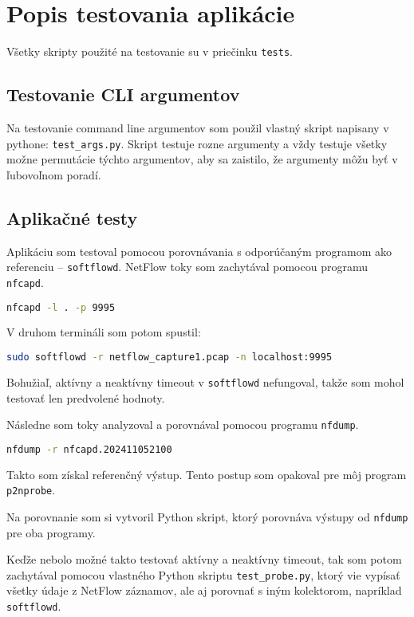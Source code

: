 \documentclass[a4paper, 12pt]{article}
\begin{document}
\newpage
\section{Popis testovania aplikácie}

Všetky skripty použité na testovanie su v priečinku \texttt{tests}.

\subsection{Testovanie CLI argumentov}
Na testovanie command line argumentov som použil vlastný skript napisany v pythone: \texttt{test\_args.py}.
Skript testuje rozne argumenty a vždy testuje všetky možne permutácie týchto argumentov, aby sa zaistilo, že argumenty môžu byť v ľubovoľnom poradí.

\subsection{Aplikačné testy}
Aplikáciu som testoval pomocou porovnávania s odporúčaným programom ako referenciu -- \texttt{softflowd}\cite{softflowd}. NetFlow toky som zachytával pomocou programu \texttt{nfcapd}.

\begin{lstlisting}[language=bash]
nfcapd -l . -p 9995        
\end{lstlisting}

V druhom termináli som potom spustil:

\begin{lstlisting}[language=bash]
sudo softflowd -r netflow_capture1.pcap -n localhost:9995
\end{lstlisting}

Bohužiaľ, aktívny a neaktívny timeout v \texttt{softflowd} nefungoval, takže som mohol testovať len predvolené hodnoty.

Následne som toky analyzoval a porovnával pomocou programu \texttt{nfdump}.

\begin{lstlisting}[language=bash]
nfdump -r nfcapd.202411052100
\end{lstlisting}

Takto som získal referenčný výstup. Tento postup som opakoval pre môj program \texttt{p2nprobe}.

Na porovnanie som si vytvoril Python skript, ktorý porovnáva výstupy od \texttt{nfdump} pre oba programy.

Keďže nebolo možné takto testovať aktívny a neaktívny timeout, tak som potom zachytával pomocou vlastného Python skriptu \texttt{test\_probe.py}, ktorý vie vypísať všetky údaje z NetFlow záznamov, ale aj porovnať s iným kolektorom, napríklad \texttt{softflowd}.
\end{document}
